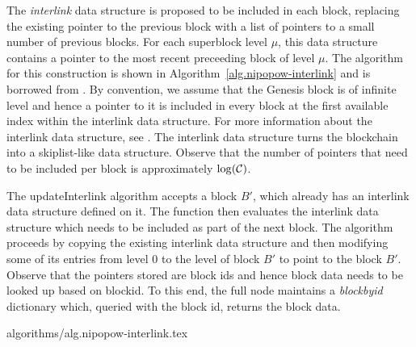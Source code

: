 The \textit{interlink} data structure is proposed to be included in each block,
replacing the existing pointer to the previous block with a list of pointers to
a small number of previous blocks. For each superblock level $\mu$, this data
structure contains a pointer to the most recent preceeding block of level
$\mu$. The algorithm for this construction is shown in
Algorithm~\ref{alg.nipopow-interlink} and is borrowed from \cite{KLS}. By
convention, we assume that the Genesis block is of infinite level and hence a
pointer to it is included in every block at the first available index within
the interlink data structure. For more information about the interlink data
structure, see \cite{KLS}. The interlink data structure turns the blockchain
into a skiplist-like data structure. Observe that the number of pointers that
need to be included per block is approximately $\log(\mathcal{C})$.

The updateInterlink algorithm accepts a block $B'$, which already has an
interlink data structure defined on it. The function then evaluates the
interlink data structure which needs to be included as part of the next block.
The algorithm proceeds by copying the existing interlink data structure and
then modifying some of its entries from level $0$ to the level of block $B'$ to
point to the block $B'$. Observe that the pointers stored are block ids and
hence block data needs to be looked up based on blockid. To this end, the full
node maintains a \textit{blockbyid} dictionary which, queried with the block
id, returns the block data.

{algorithms/alg.nipopow-interlink.tex}
